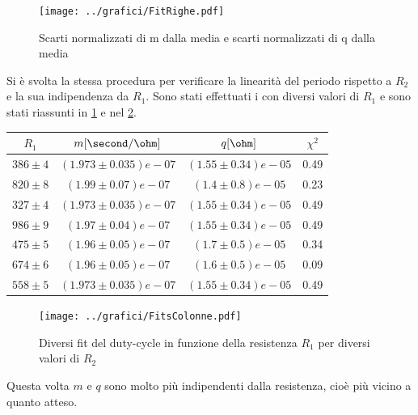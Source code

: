 \documentclass[a4paper,10pt]{article}
\begin{document}


\begin{figure}[H]
	\centering
	\texttt{[image: ../grafici/FitRighe.pdf]}
	\caption{Scarti normalizzati di m dalla media e scarti normalizzati di q dalla media}
	\label{fig:FitRighe}
\end{figure}




Si è svolta la stessa procedura per verificare la linearità del periodo rispetto a $R_2$ e la sua indipendenza da $R_1$. Sono stati effettuati i con diversi valori di $R_1$ e sono stati riassunti in \cref{tab:FitsColonne} e nel \cref{fig:FitsColonne}.

\begin{table}[H]
\centering
\begin{tabular}{c|c|c|c} 
$R_1$ & $m [\second/\ohm]$ & $q [\ohm]$ & $\chi^2$\\
\hline
$386 \pm 4$ & $(1.973 \pm 0.035)e-07$ & $(1.55 \pm 0.34)e-05 $& 0.49\\
$820 \pm 8$ & $(1.99  \pm 0.07)e-07 $&  $(1.4  \pm 0.8)e-05 $& 0.23\\
$327 \pm 4$ & $(1.973 \pm 0.035)e-07 $& $(1.55 \pm 0.34)e-05 $& 0.49\\
$986 \pm 9$ & $(1.97  \pm  0.04)e-07 $& $(1.55 \pm 0.34)e-05 $& 0.49\\
$475 \pm 5$ & $(1.96  \pm 0.05)e-07 $&  $(1.7  \pm 0.5)e-05 $& 0.34\\
$674 \pm 6$ & $(1.96  \pm 0.05)e-07 $&  $(1.6  \pm 0.5)e-05 $& 0.09\\
$558 \pm 5$ & $(1.973 \pm 0.035)e-07 $& $(1.55 \pm 0.34)e-05 $& 0.49\\
\end{tabular}
\label{tab:FitsColonne}
\end{table}

\begin{figure}[H]
	\centering
	\texttt{[image: ../grafici/FitsColonne.pdf]}
	\caption{Diversi fit del duty-cycle in funzione della resistenza $R_1$ per diversi valori di $R_2$}
	\label{fig:FitsColonne}
\end{figure}


Questa volta $m$ e $q$ sono molto più indipendenti dalla resistenza, cioè più vicino a quanto atteso.
\end{document}

